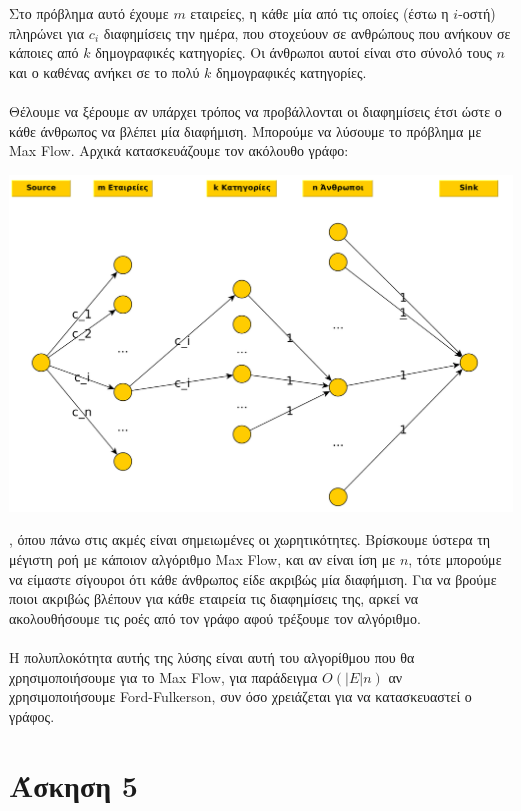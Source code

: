 \documentclass[12pt,a4paper]{article}
\begin{document}
    Στο πρόβλημα αυτό έχουμε \(m\) εταιρείες, η κάθε μία από τις οποίες
    (έστω η \(i\)-οστή) πληρώνει για \(c_i\) διαφημίσεις την ημέρα, που
    στοχεύουν σε ανθρώπους που ανήκουν σε κάποιες από \(k\) δημογραφικές
    κατηγορίες. Οι άνθρωποι αυτοί είναι στο σύνολό τους \(n\) και ο καθένας
    ανήκει σε το πολύ \(k\) δημογραφικές κατηγορίες.
    \\
    \\
    Θέλουμε να ξέρουμε αν υπάρχει τρόπος να προβάλλονται οι διαφημίσεις έτσι
    ώστε ο κάθε άνθρωπος να βλέπει μία διαφήμιση. Μπορούμε να λύσουμε το
    πρόβλημα με {\latintext Max Flow}. Αρχικά κατασκευάζουμε τον ακόλουθο
    γράφο:
    \begin{center}
      \includegraphics[width=\textwidth]{algo4a-graph.png}
    \end{center}
    , όπου πάνω στις ακμές είναι σημειωμένες οι χωρητικότητες. Βρίσκουμε ύστερα
    τη μέγιστη ροή με κάποιον αλγόριθμο {\latintext Max Flow}, και αν είναι ίση
    με \(n\), τότε μπορούμε να είμαστε σίγουροι ότι κάθε άνθρωπος είδε ακριβώς
    μία διαφήμιση. Για να βρούμε ποιοι ακριβώς βλέπουν για κάθε εταιρεία τις
    διαφημίσεις της, αρκεί να ακολουθήσουμε τις ροές από τον γράφο αφού τρέξουμε
    τον αλγόριθμο.
    \\
    \\
    Η πολυπλοκότητα αυτής της λύσης είναι αυτή του αλγορίθμου που θα
    χρησιμοποιήσουμε για το {\latintext Max Flow}, για παράδειγμα \(O(|E|n)\)
    αν χρησιμοποιήσουμε {\latintext Ford-Fulkerson}, συν όσο χρειάζεται για
    να κατασκευαστεί ο γράφος.

  \section{Άσκηση 5}
\end{document}
